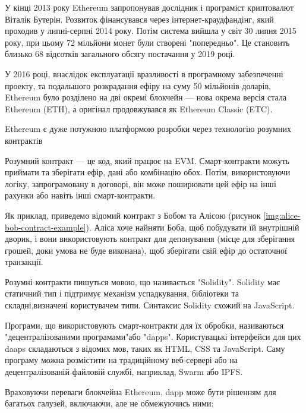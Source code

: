 \documentclass{lib/styles/default-style}
\begin{document}
    У кінці 2013 року Ethereum запропонував дослідник
    і програміст криптовалют Віталік Бутерін. Розвиток фінансувався через інтернет-краудфандінг, який проходив
    у липні-серпні 2014 року. Потім система вийшла у світ 30 липня 2015 року, при цьому 72 мільйони монет були
    створені "попередньо". Це становить близько 68 відсотків загального обсягу постачання у 2019 році.

    У 2016 році,
    внаслідок експлуатації вразливості в програмному забезпеченні проекту, та подальшого розкрадання ефіру на суму 
    50 мільйонів доларів, Ethereum було розділено на дві окремі блокчейн --- нова окрема версія стала Ethereum (ETH), а оригінал продовжувався 
    як Ethereum Classic (ETC).

    Ethereum є дуже потужною платформою розробки через технологію розумних контрактів

    Розумний контракт --- це код, який працює на EVM.
    Смарт-контракти можуть приймати та зберігати ефір, дані або комбінацію обох.
    Потім, використовуючи логіку, запрограмовану в договорі, він може поширювати
    цей ефір на інші рахунки або навіть інші смарт-контракти.

    Як приклад, приведемо відомий контракт з Бобом та Алісою (рисунок \ref{img:alice-bob-contract-example}). Аліса хоче найняти Боба, щоб побудувати їй внутрішній дворик,
    і вони використовують контракт для депонування (місце для зберігання грошей, доки умова не буде виконана),
    щоб зберігати свій ефір до остаточної транзакції.


    Розумні контракти пишуться мовою, що називається "Solidity". Solidity має статичний тип і підтримує механізм успадкування,
    бібліотеки та складні,визначені користувачем типи. Синтаксис Solidity схожий на JavaScript.

    Програми, що використовують смарт-контракти для їх обробки, називаються "децентралізованими програмами"\enspace або "dapps".
    Користувацькі інтерфейси для цих daaps складаються з відомих мов, таких як HTML, CSS та JavaScript.
    Саму програму можна розмістити на традиційному веб-сервері або на децентралізованій файловій службі, наприклад, Swarm або IPFS.

    Враховуючи переваги блокчейна Ethereum, dapp може бути рішенням для багатьох галузей, включаючи, але не обмежуючись ними:

\end{document}
